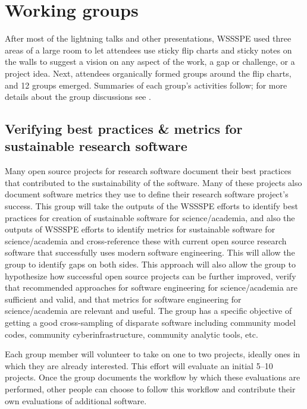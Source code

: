 \documentclass[11pt, oneside]{amsart}
\newcommand{\note}[1]{ {\textcolor{blueish}    { ***Note:      #1 }}}
\begin{document}
\section{Working groups} \label{sec:WGs}

After most of the lightning talks and other presentations, WSSSPE used three areas of a large room to let
attendees use sticky flip charts and sticky notes on the walls to suggest a vision on any aspect of the work, a gap or challenge, or a project idea.
Next, attendees organically formed groups around the flip charts, and 12 groups emerged.
Summaries of each group's activities follow; for more details
about the group discussions see \cite{WSSSPE4-report}.



\subsection{Verifying best practices \& metrics for sustainable research software}
\label{sec:best-practices-sustainable}


Many open source projects for research software document their best practices that
contributed to the sustainability of the software.  Many of these projects also
document software metrics they use to define their research software project's success.
%
This group will take the outputs of the WSSSPE efforts to identify best practices for creation of sustainable software for science/academia, and also the outputs of WSSSPE efforts to identify metrics for sustainable software for science/academia and cross-reference these with current open source research software that successfully uses modern software engineering.  This will allow the group to identify gaps on both sides.  This approach will also allow the group to hypothesize how successful open source projects can be further improved, verify that recommended approaches for software engineering for science/academia are sufficient and valid, and that metrics for software engineering for science/academia are relevant and useful.  The group has a specific objective of getting a good cross-sampling of disparate software including community model codes, community cyberinfrastructure, community analytic tools, etc.

Each group member will volunteer to take on one to two projects, ideally ones in which they are already interested.  This effort will evaluate an initial 5--10 projects.  Once the group documents the workflow by which these evaluations are performed, other people can choose to follow this workflow and contribute their own evaluations of additional software.
\end{document}
